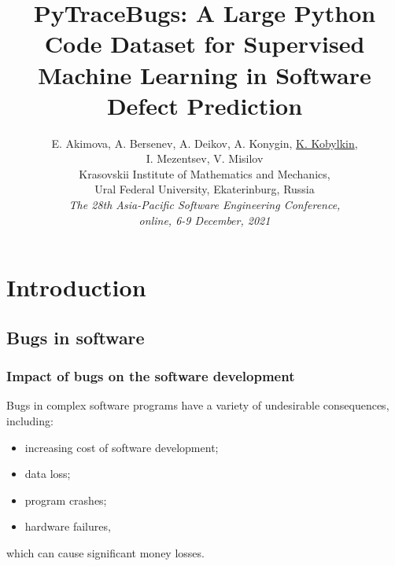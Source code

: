 \documentclass{beamer}
\begin{document}
\title[PyTraceBugs: A Large Python Code Dataset for Software Defect Prediction]{PyTraceBugs: A Large Python Code Dataset
for Supervised Machine Learning
in Software Defect Prediction}
\author[E. Akimova et.al]{\begin{block}{}\begin{center} {E. Akimova, A. Bersenev, A. Deikov, A. Konygin, {\underline{K. Kobylkin}}, \\ I. Mezentsev, V. Misilov} \\
{\footnotesize Krasovskii Institute of Mathematics and Mechanics,}\\
{\footnotesize Ural Federal University, Ekaterinburg, Russia}\\
{\textsl{The 28th Asia-Pacific Software Engineering Conference, \\ online, 6-9 December, 2021}}\end{center}\end{block}}
\date{}
\begin{frame}
\titlepage
\end{frame}


\section{Introduction}
\subsection{Bugs in software}

\begin{frame}
\frametitle{Impact of bugs on the software development}

Bugs in complex software programs have a variety of undesirable consequences,
including:
\begin{itemize}
\item increasing cost of software development;
\item data loss;
\item program crashes;
\item hardware failures,
\end{itemize}
which can cause significant money losses. 

\end{frame}
\end{document}
